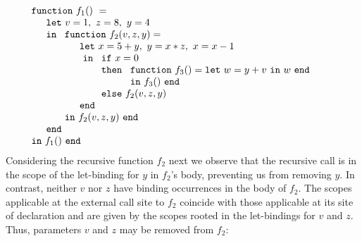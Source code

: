 \begin{equation}
\label{FunctionalConstructionProgram5}
\begin{array}{l}
\mathtt{function}\ f_1()\ = \\
  \quad
  \begin{array}{l}
     \mathtt{let}\ v = 1, \ 
                   z = 8, \ 
                   y = 4\\
     \mathtt{in}\ 
     \begin{array}[t]{l}
       \mathtt{function}\ f_2(v,z,y) =\\
         \quad
         \begin{array}{l}
           \mathtt{let}\ x = 5+y,\
                         y = x*z,\
                         x = x-1\\\
           \mathtt{in}\
           \begin{array}[t]{l}
             \mathtt{if}\ x=0\\ 
             \mathtt{then}\ 
               \begin{array}[t]{l}
                 \mathtt{function}\ f_3() = 
                 \mathtt{let}\ w = y+v\ \mathtt{in}\ w\ \mathtt{end}\\
                 \mathtt{in}\ f_3()\ \mathtt{end}
               \end{array}\\
             \mathtt{else}\ f_2(v,z,y)
           \end{array}\\
           \mathtt{end}
         \end{array}\\
     \mathtt{in}\ f_2(v,z,y)\ \mathtt{end}
     \end{array}\\
     \mathtt{end}\\
   \end{array}\\
\mathtt{in}\ f_1()\ \mathtt{end}
\end{array}
\end{equation}
Considering the recursive function $f_2$ next we observe that the
recursive call is in the scope of the let-binding for $y$ in $f_2$'s
body, preventing us from removing $y$.  In contrast, neither $v$ nor
$z$ have binding occurrences in the body of $f_2$. The scopes
applicable at the external call site to $f_2$ coincide with those
applicable at its site of declaration and are given by the scopes
rooted in the let-bindings for $v$ and $z$. Thus, parameters $v$ and
$z$ may be removed from $f_2$:
